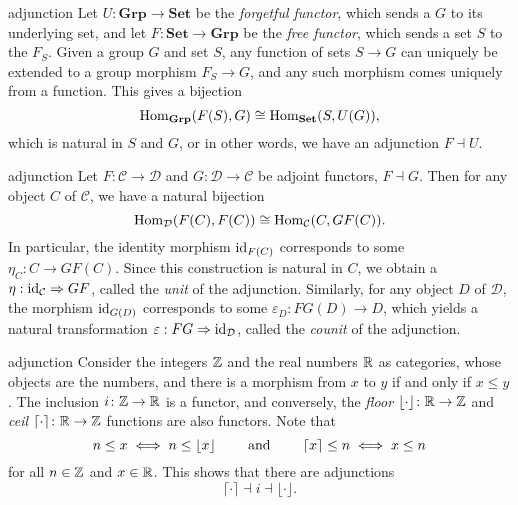 \begin{example}{adjunction}
    Let $U \colon \textbf{Grp} \to \textbf{Set}$ be the \textit{forgetful functor}, which sends a  $G$ to its underlying set, and let $F \colon \textbf{Set} \to \textbf{Grp}$ be the \textit{free functor}, which sends a set $S$ to the  $F_S$. Given a group $G$ and set $S$, any function of sets $S \to G$ can uniquely be extended to a group morphism $F_S \to G$, and any such morphism comes uniquely from a function. This gives a bijection
    \[ \operatorname{Hom}_{\textbf{Grp}}(F(S), G) \cong \operatorname{Hom}_{\textbf{Set}}(S, U(G)) , \]
    which is natural in $S$ and $G$, or in other words, we have an adjunction $F \dashv U$.
\end{example}

\begin{example}{adjunction}
    Let $F \colon \mathcal{C} \to \mathcal{D}$ and $G \colon \mathcal{D} \to \mathcal{C}$ be adjoint functors, $F \dashv G$. Then for any object $C$ of $\mathcal{C}$, we have a natural bijection
    \[ \operatorname{Hom}_{\mathcal{D}}(F(C), F(C)) \cong \operatorname{Hom}_{\mathcal{C}}(C, GF(C)) . \]
    In particular, the identity morphism $\textup{id}_{F(C)}$ corresponds to some $\eta_C \colon C \to GF(C)$. Since this construction is natural in $C$, we obtain a  $\eta : \textup{id}_\mathcal{C} \Rightarrow GF$, called the \textit{unit} of the adjunction.
    Similarly, for any object $D$ of $\mathcal{D}$, the morphism $\textup{id}_{G(D)}$ corresponds to some $\varepsilon_D \colon FG(D) \to D$, which yields a natural transformation $\varepsilon : FG \Rightarrow \textup{id}_\mathcal{D}$, called the \textit{counit} of the adjunction.
\end{example}

\begin{example}{adjunction}
    Consider the integers $\mathbb{Z}$ and the real numbers $\mathbb{R}$ as categories, whose objects are the numbers, and there is a morphism from $x$ to $y$ if and only if $x \le y$. The inclusion $i \colon \mathbb{Z} \to \mathbb{R}$ is a functor, and conversely, the \textit{floor} $\lfloor \cdot \rfloor \colon \mathbb{R} \to \mathbb{Z}$ and \textit{ceil} $\lceil \cdot \rceil \colon \mathbb{R} \to \mathbb{Z}$ functions are also functors. Note that
    \[ n \le x \iff n \le \lfloor x \rfloor \qquad \textup{ and } \qquad \lceil x \rceil \le n \iff x \le n \]
    for all $n \in \mathbb{Z}$ and $x \in \mathbb{R}$. This shows that there are adjunctions
    \[ \lceil \cdot \rceil \dashv i \dashv \lfloor \cdot \rfloor . \]
\end{example}

